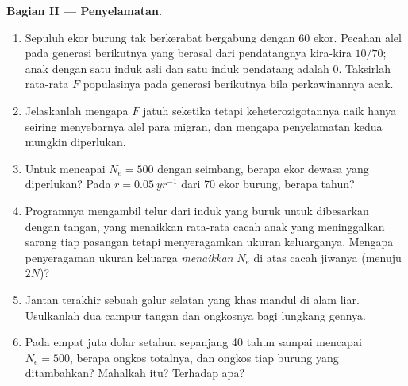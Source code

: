 \begin{problem}
\medskip
\noindent\textbf{Bagian II --- Penyelamatan.}
\begin{enumerate}[resume]
  \item Sepuluh ekor burung tak berkerabat bergabung dengan 60 ekor.
        Pecahan alel pada generasi berikutnya yang berasal dari
        pendatangnya kira-kira $10/70$;  anak dengan
        satu induk asli dan satu induk pendatang adalah $0$. Taksirlah
        rata-rata $F$ populasinya pada generasi berikutnya bila
        perkawinannya acak.
  \item Jelaskanlah mengapa $F$ jatuh seketika tetapi keheterozigotannya
        naik hanya seiring menyebarnya alel para migran, dan mengapa
        penyelamatan kedua mungkin diperlukan.
  \item Untuk mencapai $N_{e} = 500$ dengan  seimbang,
        berapa ekor dewasa yang diperlukan? Pada $r = \qty{0.05}{yr^{-1}}$
        dari 70 ekor burung, berapa tahun?
  \item Programnya mengambil telur dari induk yang buruk untuk dibesarkan
        dengan tangan, yang menaikkan rata-rata cacah anak yang
        meninggalkan sarang tiap pasangan tetapi menyeragamkan ukuran
        keluarganya. Mengapa penyeragaman ukuran keluarga \emph{menaikkan}
        $N_{e}$ di atas cacah jiwanya (menuju $2N$)?
  \item Jantan terakhir sebuah galur selatan yang khas mandul di alam
        liar. Usulkanlah dua campur tangan dan ongkosnya bagi lungkang gennya.
  \item Pada empat juta dolar setahun sepanjang 40 tahun sampai mencapai
        $N_{e} = 500$, berapa ongkos totalnya, dan ongkos tiap burung yang
        ditambahkan? Mahalkah itu? Terhadap apa?
\end{enumerate}


\end{problem}
